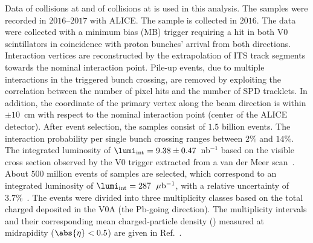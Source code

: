 \documentclass[ALICE,manyauthors]{cernphprep}
\begin{document}
Data of \pp collisions at \thirteen and of \pPb collisions at \fivenn is used in this analysis.
The \pp samples were recorded in $2016$--$2017$ with ALICE.
The \pPb sample is collected in $2016$.
The data were collected with a minimum bias (MB) trigger requiring a hit in both V0 scintillators in coincidence with proton bunches' arrival from both directions.
Interaction vertices are reconstructed by the extrapolation of ITS track segments towards the nominal interaction point.
Pile-up events, due to multiple interactions in the triggered bunch crossing, are removed by exploiting the correlation between the number of pixel hits and the number of SPD tracklets.
In addition, the coordinate of the primary vertex along the beam direction is within $\pm 10$~cm with respect to the nominal interaction point (center of the ALICE detector).
After event selection, the \pp samples consist of $1.5$ billion events.
The interaction probability per single bunch crossing ranges between $2\%$ and $14\%$.
The integrated luminosity of $\lumi_{\rm int} = 9.38\pm 0.47$~nb$^{-1}$ based on the visible cross section observed by the V0 trigger extracted from a van der Meer scan~\cite{ALICE-PUBLIC-2016-002}.
About $500$ million events of \pPb samples are selected, which correspond to an integrated luminosity of $\lumi_{\rm int} = 287$~$\mu{\rm b}^{-1}$, with a relative uncertainty of $3.7\%$~\cite{collaboration_2014}.
The \pPb events were divided into three multiplicity classes based on the total charged deposited in the V0A (the Pb-going direction).
The multiplicity intervals and their corresponding mean charged-particle density (\dndeta) measured at midrapidity ($\abs{\eta} < 0.5$) are given in Ref.~\cite{Adam:2015pza}. 

\end{document}

